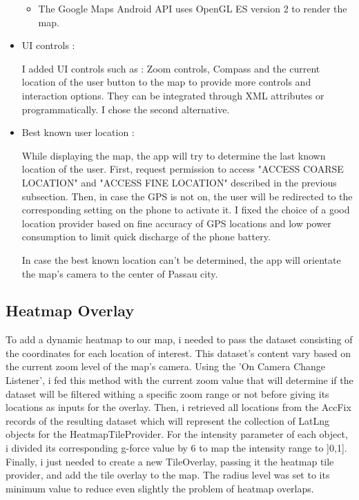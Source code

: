 \documentclass[10pt,a4paper]{article} %
\begin{document}
\begin{itemize}
\begin{itemize}
        \item The Google Maps Android API uses OpenGL ES version 2 to render the map.
        
        
        
        
		\end{itemize}
		
		
		
		
		
	
    \item UI controls :
    
	I added UI controls such as : Zoom controls, Compass and the current location of the user button to the map to provide more controls and interaction options. They can be integrated through XML attributes or programmatically. I chose the second alternative.
	
	\item Best known user location :
	
	While displaying the map, the app will try to determine the last known location of the user. First, request permission to access "ACCESS COARSE LOCATION" and "ACCESS FINE LOCATION" described in the previous subsection. Then, in case the GPS is not on, the user will be redirected to the corresponding setting on the phone to activate it. I fixed the choice of a good location provider based on fine accuracy of GPS locations and low power consumption to limit quick discharge of the phone battery.
	
	In case the best known location can't be determined, the app will orientate the map's camera to the center of Passau city.
	
	
	\end{itemize}
	
	\subsection{Heatmap Overlay}\label{subsec:heatmap}

	
	To add a dynamic heatmap to our map, i needed to pass the dataset consisting of the coordinates for each location of interest. This dataset's content vary based on the current zoom level of the map's camera. Using the 'On Camera Change Listener', i fed this method with the current zoom value that will determine if the dataset will be filtered withing a specific zoom range or not before giving its locations as inputs for the overlay.
	\noindent
	Then, i retrieved all locations from the AccFix records of the resulting dataset which will represent the collection of LatLng objects for the HeatmapTileProvider. For the intensity parameter of each object, i divided its corresponding g-force value by 6 to map the intensity range to ]0,1].
	\noindent
	Finally, i just needed to create a new TileOverlay, passing it the heatmap tile provider, and add the tile overlay to the map.
	\noindent
	The radius level was set to its minimum value to reduce even slightly the problem of heatmap overlaps.
\end{document}

